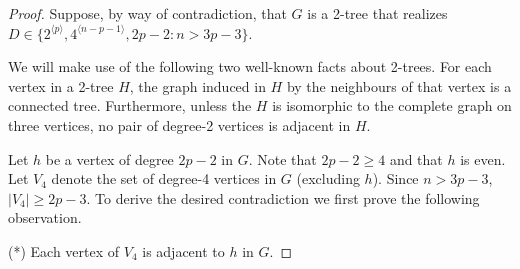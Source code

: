 \documentclass[lotsofwhite,charterfonts]{patmorin}
\newcommand{\rep}[1]{^{\langle#1\rangle}}
\begin{document}
\begin{proof}
Suppose, by way of contradiction, that $G$ is a 2-tree that realizes
$D\in\{2\rep{p},4\rep{n-p-1}, 2p-2 : \mbox{$n > 3p-3$} \}$.

We will make use of the following two well-known facts about 2-trees.
For each vertex in a 2-tree $H$, the graph induced in $H$ by the
neighbours of that vertex is a connected tree.  Furthermore, unless
the $H$ is isomorphic to the complete graph on three vertices, no pair
of degree-2 vertices is adjacent in $H$.

Let $h$ be a vertex of degree $2p-2$ in $G$. Note that $2p-2\geq 4$
and that $h$ is even. Let $V_4$ denote the set of degree-4 vertices in
$G$ (excluding $h$). Since $n>3p-3$, $|V_4|\geq 2p-3$. To derive the
desired contradiction we first prove the following observation.

(*) Each vertex of $V_4$ is adjacent to $h$ in $G$.


\end{proof}
\end{document}
